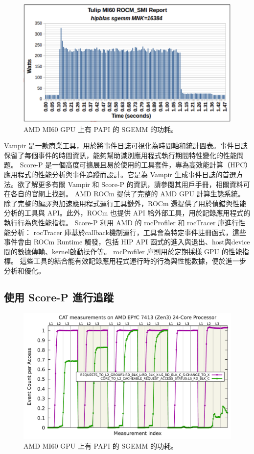 \begin{figure}
    \centering
    \includegraphics[width=0.9\linewidth]{FileAusiliari/Screenshots/Figure13-7.png}
    \caption{AMD MI60 GPU 上有 PAPI 的 SGEMM 的功耗。}
    \label{fig:PAPI7}
\end{figure}

Vampir 是一款商業工具，用於將事件日誌可視化為時間軸和統計圖表。事件日誌保留了每個事件的時間資訊，能夠幫助識別應用程式執行期間特性變化的性能問題。
Score-P 是一個高度可擴展且易於使用的工具套件，專為高效能計算（HPC）應用程式的性能分析與事件追蹤而設計。它是為 Vampir 生成事件日誌的首選方法。欲了解更多有關 Vampir 和 Score-P 的資訊，請參閱其用戶手冊，相關資料可在各自的官網上找到。
AMD ROCm 提供了完整的 AMD GPU 計算生態系統。除了完整的編譯與加速應用程式運行工具鏈外，ROCm 還提供了用於偵錯與性能分析的工具與 API。此外，ROCm 也提供 API 給外部工具，用於記錄應用程式的執行行為與性能指標。
Score-P 利用 AMD 的 rocProfiler 和 rocTracer 庫進行性能分析：
rocTracer 庫基於callback機制運行，工具會為特定事件註冊函式，這些事件會由 ROCm Runtime 觸發，包括 HIP API 函式的進入與退出、host與device間的數據傳輸、kernel啟動操作等。
rocProfiler 庫則用於定期採樣 GPU 的性能指標。
這些工具的結合能有效記錄應用程式運行時的行為與性能數據，便於進一步分析和優化。

\subsection{使用 Score-P 進行追蹤}

\begin{figure}
    \centering
    \includegraphics[width=0.9\linewidth]{FileAusiliari/Screenshots/Figure13-8.png}
    \caption{AMD MI60 GPU 上有 PAPI 的 SGEMM 的功耗。}
    \label{fig:PAPI8}
\end{figure}

